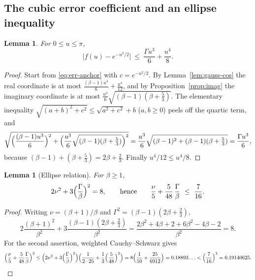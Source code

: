 \documentclass[10pt,a4paper]{article}
\theoremstyle{plain}
\newtheorem{lemma}[theorem]{Lemma}
\theoremstyle{definition}
\begin{document}
\subsection{The cubic error coefficient and an ellipse inequality}

\begin{lemma}\label{lem:small-error}
For $0\le u\le\pi$,
\begin{equation}\label{eq:small-error}
  \bigl|f(u)-e^{-u^2/2}\bigr| \ \le\ \frac{\Gamma u^3}{6}+\frac{u^4}{8}.
\end{equation}
\end{lemma}

\begin{proof}
Start from \eqref{eq:err-anchor} with $c=e^{-u^2/2}$. By
Lemma~\ref{lem:gauss-cos} the real coordinate is at most
$\tfrac{(\beta-1)u^3}{6}+\tfrac{u^4}{12}$, and by
Proposition~\ref{prop:imag} the imaginary coordinate is at most
$\tfrac{u^3}{6}\sqrt{(\beta-1)(\beta+\tfrac53)}$. The elementary inequality
$\sqrt{(a+b)^2+c^2}\le\sqrt{a^2+c^2}+b$ ($a,b\ge0$) peels off the quartic term,
and
\[
  \sqrt{\Bigl(\frac{(\beta-1)u^3}{6}\Bigr)^2
    + \Bigl(\frac{u^3}{6}\sqrt{(\beta-1)(\beta+\tfrac53)}\Bigr)^2}
  = \frac{u^3}{6}\sqrt{(\beta-1)^2+(\beta-1)(\beta+\tfrac53)}
  = \frac{\Gamma u^3}{6},
\]
because $(\beta-1)+(\beta+\tfrac53)=2\beta+\tfrac23$. Finally
$u^4/12\le u^4/8$.
\end{proof}

\begin{lemma}[Ellipse relation]\label{lem:ellipse}
For $\beta\ge1$,
\begin{equation}\label{eq:ellipse}
  2\nu^2+3\Bigl(\frac\Gamma\beta\Bigr)^2 = 8,
  \qquad\text{hence}\qquad
  \frac{\nu}{5}+\frac{5}{48}\,\frac\Gamma\beta \ \le\ \frac{7}{16}.
\end{equation}
\end{lemma}

\begin{proof}
Writing $\nu=(\beta+1)/\beta$ and $\Gamma^2=(\beta-1)(2\beta+\tfrac23)$,
\[
  2\frac{(\beta+1)^2}{\beta^2}+3\frac{(\beta-1)(2\beta+\frac23)}{\beta^2}
  = \frac{2\beta^2+4\beta+2+6\beta^2-4\beta-2}{\beta^2} = 8 .
\]
For the second assertion, weighted Cauchy--Schwarz gives
\[
  \Bigl(\frac\nu5+\frac5{48}\frac\Gamma\beta\Bigr)^2
  \le \Bigl(2\nu^2+3\Bigl(\frac\Gamma\beta\Bigr)^2\Bigr)
      \Bigl(\frac1{2\cdot25}+\frac{1}{3}\Bigl(\frac{5}{48}\Bigr)^2\Bigr)
  = 8\Bigl(\frac1{50}+\frac{25}{6912}\Bigr)
  = 0.18893\ldots < \Bigl(\frac7{16}\Bigr)^2 = 0.19140625 . \qedhere
\]
\end{proof}
\end{document}
